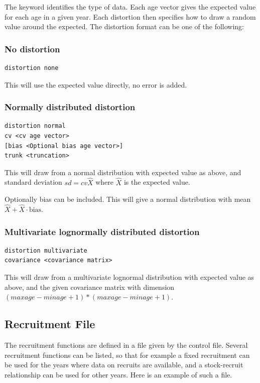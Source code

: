 \documentclass[12pt,twoside,a4paper]{article}
\begin{document}
The keyword identifies the type of data. Each age vector gives the
expected value for each age in a given year. Each distortion then
specifies how to draw a random value around the expected. The
distortion format can be one of the following:

\subsubsection{No distortion}
\begin{verbatim}distortion none\end{verbatim}
This will use the expected value directly, no error is added.

\subsubsection{Normally distributed distortion}
\begin{verbatim}
distortion normal
cv <cv age vector>
[bias <Optional bias age vector>]
trunk <truncation>
\end{verbatim}
This will draw from a normal distribution with expected value as
above, and standard deviation $sd=cv \hat{X}$ where $\hat{X}$ is the
expected value.

Optionally bias can be included. This will give a normal distribution 
with mean $\hat{X}+\hat{X}\cdot\mathrm{bias}$. 

\subsubsection{Multivariate lognormally distributed distortion}
\begin{verbatim}
distortion multivariate
covariance <covariance matrix>
\end{verbatim}
This will draw from a multivariate lognormal distribution with
expected value as above, and the given covariance matrix with dimension 
$(maxage-minage+1)*(maxage-minage+1)$. 

\subsection{Recruitment File}
The recruitment functions are defined in a file given by the control
file. Several recruitment functions can be listed, so that for example
a fixed recruitment can be used for the years where data on recruits
are available, and a stock-recruit relationship can be used for other
years. Here is an example of such a file.
\end{document}
